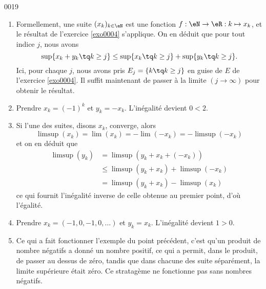 
\begin{corrige}{0019}

\begin{enumerate}
\item Formellement, une suite $(x_k)_{k\in\eN}$ est une fonction $f : \eN \to \eR : k \mapsto x_k$, et le résultat de l'exercice \ref{exo0004} s'applique. On en déduit que pour tout indice $j$, nous avons
 \begin{equation*}
    \sup\{ x_k + y_k \tq k \geq j \} \leq   \sup\{ x_k \tq k \geq j \} +  \sup\{ y_k \tq k \geq j \}.
  \end{equation*}
Ici, pour chaque $j$, nous avons pris $E_j=\{ k\tq k\geq j \}$ en guise de $E$ de l'exercice \ref{exo0004}. Il suffit maintenant de passer à la limite $(j \to \infty)$ pour obtenir le résultat.
\item
Prendre $x_k = (-1)^k$ et $y_k = -x_k$. L'inégalité devient $0 <
  2$.

\item Si l'une des suites, disons $x_k$, converge, alors
  \begin{equation*}
    \limsup (x_k) = \lim (x_k) = - \lim(-x_k) = - \limsup (-x_k)
  \end{equation*}
  et on en déduit que
  \begin{equation*}
    \begin{split}
      \limsup (y_k) &= \limsup(y_k + x_k + (-x_k))\\
      &\leq \limsup(y_k + x_k) + \limsup (-x_k)\\
      &= \limsup(y_k + x_k) - \limsup (x_k)
    \end{split}
  \end{equation*}
  ce qui fournit l'inégalité inverse de celle obtenue au premier
  point, d'où l'égalité.

\item Prendre $x_k = (-1, 0, -1, 0, \ldots)$ et $y_k =
  x_k$. L'inégalité devient $1 > 0$.

\item 

Ce qui a fait fonctionner l'exemple du point précédent, c'est qu'un produit de nombre négatifs a donné un nombre positif, ce qui a permit, dans le produit,  de passer au dessus de zéro, tandis que dans chacune des suite séparément, la limite supérieure était zéro. Ce stratagème ne fonctionne pas sans nombres négatifs.


\end{enumerate}
\end{corrige}
